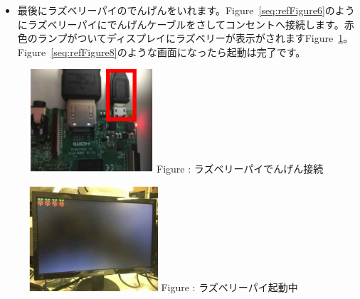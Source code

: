 \documentclass[a4paper,12pt]{jarticle}
\begin{document}
\begin{enumerate}
        \begin{itemize}
          \item
                最後にラズベリーパイのでんげんをいれます。Figure~\ref{seq:refFigure6}のようにラズベリーパイにでんげんケーブルをさしてコンセントへ接続します。赤色のランプがついてディスプレイにラズベリーが表示がされますFigure~\ref{seq:refFigure7}。Figure~\ref{seq:refFigure8}のような画面になったら起動は完了です。
        \end{itemize}
        \begin{figure}
          \centering
          \begin{minipage}{5.228cm}
            {\upshape
              \includegraphics[width=4.613cm,height=3.856cm]{textbook-img020.png}
              \newline
              Figure {\theFigure\label{seq:refFigure6}}:
              ラズベリーパイでんげん接続}
          \end{minipage}
          \begin{minipage}{5.371cm}
            {\upshape
              \includegraphics[width=4.782cm,height=3.919cm]{textbook-img021.png}
              \newline
              Figure {\theFigure\label{seq:refFigure7}}:
              ラズベリーパイ起動中}
            \end{minipage}
          \end{figure}
          
\clearpage        
\end{enumerate}
\end{document}
